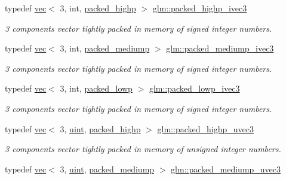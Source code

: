 \begin{DoxyCompactItemize}
typedef \hyperlink{structglm_1_1vec}{vec}$<$ 3, int, \hyperlink{namespaceglm_a36ed105b07c7746804d7fdc7cc90ff25a8e8791ee77fe079b1291f710d88031bf}{packed\+\_\+highp} $>$ \hyperlink{group__gtc__type__aligned_ga56b9f0123506edc416bbcf957d3ce678}{glm\+::packed\+\_\+highp\+\_\+ivec3}
\begin{DoxyCompactList}\small\item\em 3 components vector tightly packed in memory of signed integer numbers. \end{DoxyCompactList}\item 
typedef \hyperlink{structglm_1_1vec}{vec}$<$ 3, int, \hyperlink{namespaceglm_a36ed105b07c7746804d7fdc7cc90ff25a9604654c3b137cd7898689fd34b25bc0}{packed\+\_\+mediump} $>$ \hyperlink{group__gtc__type__aligned_ga7f737483a80a724f8fde24e8402616f8}{glm\+::packed\+\_\+mediump\+\_\+ivec3}
\begin{DoxyCompactList}\small\item\em 3 components vector tightly packed in memory of signed integer numbers. \end{DoxyCompactList}\item 
typedef \hyperlink{structglm_1_1vec}{vec}$<$ 3, int, \hyperlink{namespaceglm_a36ed105b07c7746804d7fdc7cc90ff25ac36a4bd74559be2c0b65bc48e5953b8b}{packed\+\_\+lowp} $>$ \hyperlink{group__gtc__type__aligned_gac0de36c7d01951895c5e227817508a15}{glm\+::packed\+\_\+lowp\+\_\+ivec3}
\begin{DoxyCompactList}\small\item\em 3 components vector tightly packed in memory of signed integer numbers. \end{DoxyCompactList}\item 
typedef \hyperlink{structglm_1_1vec}{vec}$<$ 3, \hyperlink{group__core__precision_ga4fd29415871152bfb5abd588334147c8}{uint}, \hyperlink{namespaceglm_a36ed105b07c7746804d7fdc7cc90ff25a8e8791ee77fe079b1291f710d88031bf}{packed\+\_\+highp} $>$ \hyperlink{group__gtc__type__aligned_ga607425d3ca2ad292b115d09aef19e372}{glm\+::packed\+\_\+highp\+\_\+uvec3}
\begin{DoxyCompactList}\small\item\em 3 components vector tightly packed in memory of unsigned integer numbers. \end{DoxyCompactList}\item 
typedef \hyperlink{structglm_1_1vec}{vec}$<$ 3, \hyperlink{group__core__precision_ga4fd29415871152bfb5abd588334147c8}{uint}, \hyperlink{namespaceglm_a36ed105b07c7746804d7fdc7cc90ff25a9604654c3b137cd7898689fd34b25bc0}{packed\+\_\+mediump} $>$ \hyperlink{group__gtc__type__aligned_gaa79317c123076b994c5c1b46a5b41351}{glm\+::packed\+\_\+mediump\+\_\+uvec3}

\end{DoxyCompactItemize}
